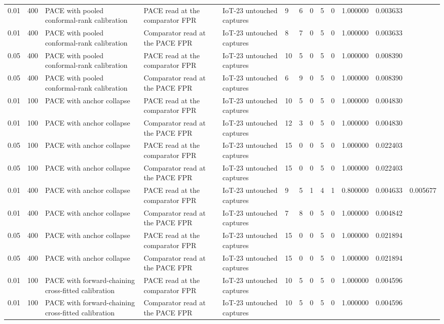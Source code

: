 \begin{tabular}{lllllllllllll}
0.01 & 400 & PACE with pooled conformal-rank calibration & PACE read at the comparator FPR & IoT-23 untouched captures & 9 & 6 & 0 & 5 & 0 & 1.000000 & 0.003633 &  \\
0.01 & 400 & PACE with pooled conformal-rank calibration & Comparator read at the PACE FPR & IoT-23 untouched captures & 8 & 7 & 0 & 5 & 0 & 1.000000 & 0.003633 &  \\
0.05 & 400 & PACE with pooled conformal-rank calibration & PACE read at the comparator FPR & IoT-23 untouched captures & 10 & 5 & 0 & 5 & 0 & 1.000000 & 0.008390 &  \\
0.05 & 400 & PACE with pooled conformal-rank calibration & Comparator read at the PACE FPR & IoT-23 untouched captures & 6 & 9 & 0 & 5 & 0 & 1.000000 & 0.008390 &  \\
0.01 & 100 & PACE with anchor collapse & PACE read at the comparator FPR & IoT-23 untouched captures & 10 & 5 & 0 & 5 & 0 & 1.000000 & 0.004830 &  \\
0.01 & 100 & PACE with anchor collapse & Comparator read at the PACE FPR & IoT-23 untouched captures & 12 & 3 & 0 & 5 & 0 & 1.000000 & 0.004830 &  \\
0.05 & 100 & PACE with anchor collapse & PACE read at the comparator FPR & IoT-23 untouched captures & 15 & 0 & 0 & 5 & 0 & 1.000000 & 0.022403 &  \\
0.05 & 100 & PACE with anchor collapse & Comparator read at the PACE FPR & IoT-23 untouched captures & 15 & 0 & 0 & 5 & 0 & 1.000000 & 0.022403 &  \\
0.01 & 400 & PACE with anchor collapse & PACE read at the comparator FPR & IoT-23 untouched captures & 9 & 5 & 1 & 4 & 1 & 0.800000 & 0.004633 & 0.005677 \\
0.01 & 400 & PACE with anchor collapse & Comparator read at the PACE FPR & IoT-23 untouched captures & 7 & 8 & 0 & 5 & 0 & 1.000000 & 0.004842 &  \\
0.05 & 400 & PACE with anchor collapse & PACE read at the comparator FPR & IoT-23 untouched captures & 15 & 0 & 0 & 5 & 0 & 1.000000 & 0.021894 &  \\
0.05 & 400 & PACE with anchor collapse & Comparator read at the PACE FPR & IoT-23 untouched captures & 15 & 0 & 0 & 5 & 0 & 1.000000 & 0.021894 &  \\
0.01 & 100 & PACE with forward-chaining cross-fitted calibration & PACE read at the comparator FPR & IoT-23 untouched captures & 10 & 5 & 0 & 5 & 0 & 1.000000 & 0.004596 &  \\
0.01 & 100 & PACE with forward-chaining cross-fitted calibration & Comparator read at the PACE FPR & IoT-23 untouched captures & 10 & 5 & 0 & 5 & 0 & 1.000000 & 0.004596 &  \\

\end{tabular}
